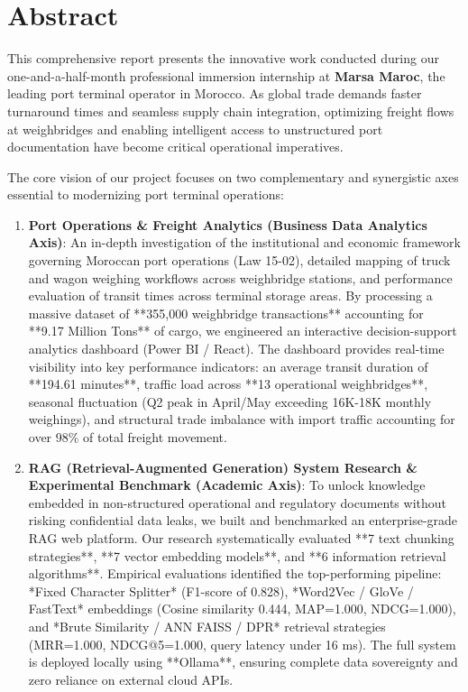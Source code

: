 \documentclass[12pt,a4paper,oneside]{report}
\begin{document}
\vspace{1cm}

\chapter*{Abstract}

This comprehensive report presents the innovative work conducted during our one-and-a-half-month professional immersion internship at \textbf{Marsa Maroc}, the leading port terminal operator in Morocco. As global trade demands faster turnaround times and seamless supply chain integration, optimizing freight flows at weighbridges and enabling intelligent access to unstructured port documentation have become critical operational imperatives.

The core vision of our project focuses on two complementary and synergistic axes essential to modernizing port terminal operations:
\begin{enumerate}
    \item \textbf{Port Operations \& Freight Analytics (Business Data Analytics Axis)}: An in-depth investigation of the institutional and economic framework governing Moroccan port operations (Law 15-02), detailed mapping of truck and wagon weighing workflows across weighbridge stations, and performance evaluation of transit times across terminal storage areas. By processing a massive dataset of **355,000 weighbridge transactions** accounting for **9.17 Million Tons** of cargo, we engineered an interactive decision-support analytics dashboard (Power BI / React). The dashboard provides real-time visibility into key performance indicators: an average transit duration of **194.61 minutes**, traffic load across **13 operational weighbridges**, seasonal fluctuation (Q2 peak in April/May exceeding 16K-18K monthly weighings), and structural trade imbalance with import traffic accounting for over 98\% of total freight movement.
    \item \textbf{RAG (Retrieval-Augmented Generation) System Research \& Experimental Benchmark (Academic Axis)}: To unlock knowledge embedded in non-structured operational and regulatory documents without risking confidential data leaks, we built and benchmarked an enterprise-grade RAG web platform. Our research systematically evaluated **7 text chunking strategies**, **7 vector embedding models**, and **6 information retrieval algorithms**. Empirical evaluations identified the top-performing pipeline: *Fixed Character Splitter* (F1-score of 0.828), *Word2Vec / GloVe / FastText* embeddings (Cosine similarity 0.444, MAP=1.000, NDCG=1.000), and *Brute Similarity / ANN FAISS / DPR* retrieval strategies (MRR=1.000, NDCG@5=1.000, query latency under 16 ms). The full system is deployed locally using **Ollama**, ensuring complete data sovereignty and zero reliance on external cloud APIs.
\end{enumerate}
\end{document}
